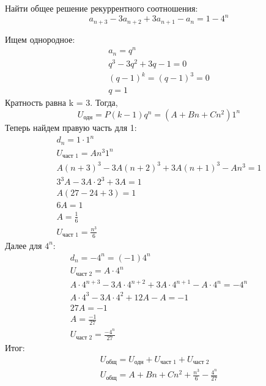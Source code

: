 \begin{task}
    Найти общее решение рекуррентного соотношения:
    \begin{equation*}
        a_{n+3} - 3a_{n+2} + 3a_{n+1} - a_n = 1 - 4^n
    \end{equation*}
    \begin{solution}
        Ищем однородное:
        \begin{gather*}
            a_n = q^n \\
            q^3 - 3q^2 + 3q - 1 = 0 \\
            (q - 1)^k = (q - 1)^3 = 0 \\
            q = 1
        \end{gather*}
        Кратность равна k = 3.
        Тогда,
        \begin{equation*}
            U_{\text{одн}} = P(k-1)q^n = (A + Bn + Cn^2)1^n
        \end{equation*}
        Теперь найдем правую часть для 1:
        \begin{gather*}
            d_n = 1 \cdot 1^n \\
            U_{\text{част 1}} = A n^3 1^n \\
            A(n+3)^3 - 3A(n+2)^3 + 3A(n+1)^3 - An^3 = 1 \\
            3^3A - 3A \cdot 2^3 + 3A = 1 \\
            A(27 - 24 + 3) = 1 \\
            6A = 1 \\
            A = \frac{1}{6} \\
            U_{\text{част 1}} = \frac{n^3}{6}
        \end{gather*}
        Далее для $4^n$:
        \begin{gather*}
            d_n = -4^n = (-1) 4^n \\
            U_{\text{част 2}} = A \cdot 4^n \\
            A \cdot 4^{n+3} - 3A \cdot 4^{n+2} + 3A \cdot 4^{n+1} - A \cdot 4^n = -4^n \\
            A \cdot 4^3 - 3A \cdot 4^2 + 12 A - A = -1 \\
            27A = -1 \\
            A = \frac{-1}{27} \\
            U_{\text{част 2}} = \frac{-4^n}{27}
        \end{gather*}
        Итог:
        \begin{gather*}
            U_{\text{общ}} = U_{\text{одн}} + U_{\text{част 1}} + U_{\text{част 2}} \\
            U_{\text{общ}} = A + Bn + Cn^2 + \frac{n^3}{6} - \frac{4^n}{27}
        \end{gather*}
    \end{solution}
\end{task}